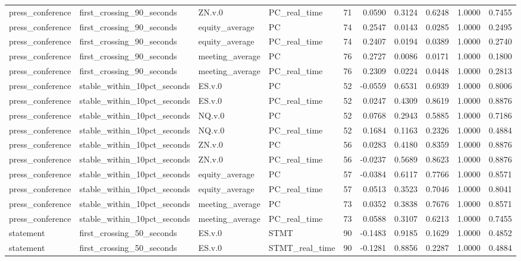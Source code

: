 \begin{tabular}{llllrrrrrr}
press_conference & first_crossing_90_seconds & ZN.v.0 & PC_real_time & 71 & 0.0590 & 0.3124 & 0.6248 & 1.0000 & 0.7455 \\
press_conference & first_crossing_90_seconds & equity_average & PC & 74 & 0.2547 & 0.0143 & 0.0285 & 1.0000 & 0.2495 \\
press_conference & first_crossing_90_seconds & equity_average & PC_real_time & 74 & 0.2407 & 0.0194 & 0.0389 & 1.0000 & 0.2740 \\
press_conference & first_crossing_90_seconds & meeting_average & PC & 76 & 0.2727 & 0.0086 & 0.0171 & 1.0000 & 0.1800 \\
press_conference & first_crossing_90_seconds & meeting_average & PC_real_time & 76 & 0.2309 & 0.0224 & 0.0448 & 1.0000 & 0.2813 \\
press_conference & stable_within_10pct_seconds & ES.v.0 & PC & 52 & -0.0559 & 0.6531 & 0.6939 & 1.0000 & 0.8006 \\
press_conference & stable_within_10pct_seconds & ES.v.0 & PC_real_time & 52 & 0.0247 & 0.4309 & 0.8619 & 1.0000 & 0.8876 \\
press_conference & stable_within_10pct_seconds & NQ.v.0 & PC & 52 & 0.0768 & 0.2943 & 0.5885 & 1.0000 & 0.7186 \\
press_conference & stable_within_10pct_seconds & NQ.v.0 & PC_real_time & 52 & 0.1684 & 0.1163 & 0.2326 & 1.0000 & 0.4884 \\
press_conference & stable_within_10pct_seconds & ZN.v.0 & PC & 56 & 0.0283 & 0.4180 & 0.8359 & 1.0000 & 0.8876 \\
press_conference & stable_within_10pct_seconds & ZN.v.0 & PC_real_time & 56 & -0.0237 & 0.5689 & 0.8623 & 1.0000 & 0.8876 \\
press_conference & stable_within_10pct_seconds & equity_average & PC & 57 & -0.0384 & 0.6117 & 0.7766 & 1.0000 & 0.8571 \\
press_conference & stable_within_10pct_seconds & equity_average & PC_real_time & 57 & 0.0513 & 0.3523 & 0.7046 & 1.0000 & 0.8041 \\
press_conference & stable_within_10pct_seconds & meeting_average & PC & 73 & 0.0352 & 0.3838 & 0.7676 & 1.0000 & 0.8571 \\
press_conference & stable_within_10pct_seconds & meeting_average & PC_real_time & 73 & 0.0588 & 0.3107 & 0.6213 & 1.0000 & 0.7455 \\
statement & first_crossing_50_seconds & ES.v.0 & STMT & 90 & -0.1483 & 0.9185 & 0.1629 & 1.0000 & 0.4852 \\
statement & first_crossing_50_seconds & ES.v.0 & STMT_real_time & 90 & -0.1281 & 0.8856 & 0.2287 & 1.0000 & 0.4884 \\

\end{tabular}

